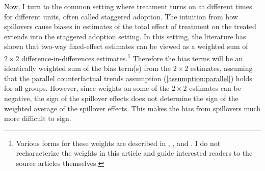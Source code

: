 \documentclass[11pt]{article}
\begin{document}
Now, I turn to the common setting where treatment turns on at different times for different units, often called staggered adoption. The intuition from how spillovers cause biases in estimates of the total effect of treatment on the treated extends into the staggered adoption setting. In this setting, the literature has shown that two-way fixed-effect estimates can be viewed as a weighted sum of $2 \times 2$ difference-in-differences estimates.\footnote{Various forms for these weights are described in \citet{Goodman-Bacon_2018}, \citet{Sun_Abraham_2020}, and \citet{deChaisemartin_DHaultfoeuille_2019}. I do not recharacterize the weights in this article and guide interested readers to the source articles themselves.} Therefore the bias terms will be an identically weighted sum of the bias term(s) from the $2 \times 2$ estimates, assuming that the parallel counterfactual trends assumption (\ref{assumption:parallel}) holds for all groups. However, since weights on some of the $2 \times 2$ estimates can be negative, the sign of the spillover effects does not determine the sign of the weighted average of the spillover effects. This makes the bias from spillovers much more difficult to sign. 
\end{document}
